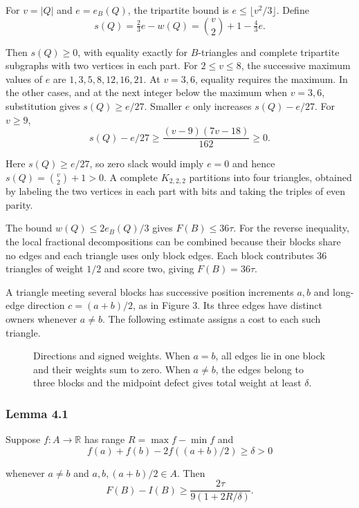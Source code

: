 \documentclass[english,11pt,a4paper]{article}
\begin{document}
For \(v=|Q|\) and \(e=e_B(Q)\), the tripartite bound is \(e\le\lfloor v^2/3\rfloor\). Define
\[s(Q)=\tfrac23 e-w(Q)=\binom v2+1-\tfrac43e.\]

Then \(s(Q)\ge0\), with equality exactly for \(B\)-triangles and complete tripartite subgraphs with two vertices in each part. For \(2\le v\le8\), the successive maximum values of \(e\) are \(1,3,5,8,12,16,21\). At \(v=3,6\), equality requires the maximum. In the other cases, and at the next integer below the maximum when \(v=3,6\), substitution gives \(s(Q)\ge e/27\). Smaller \(e\) only increases \(s(Q)-e/27\). For \(v\ge9\),
\[s(Q)-e/27\ge \frac{(v-9)(7v-18)}{162}\ge0.\]

Here \(s(Q)\ge e/27\), so zero slack would imply \(e=0\) and hence \(s(Q)=\binom v2+1>0\). A complete \(K_{2,2,2}\) partitions into four triangles, obtained by labeling the two vertices in each part with bits and taking the triples of even parity.

The bound \(w(Q)\le 2e_B(Q)/3\) gives \(F(B)\le36\tau\). For the reverse inequality, the local fractional decompositions can be combined because their blocks share no edges and each triangle uses only block edges. Each block contributes 36 triangles of weight \(1/2\) and score two, giving \(F(B)=36\tau\).

A triangle meeting several blocks has successive position increments \(a,b\) and long-edge direction \(c=(a+b)/2\), as in Figure 3. Its three edges have distinct owners whenever \(a\ne b\). The following estimate assigns a cost to each such triangle.

\begin{figure}[htbp]
\centering
\caption{Directions and signed weights. When $a=b$, all edges lie in one block and their weights sum to zero. When $a\ne b$, the edges belong to three blocks and the midpoint defect gives total weight at least $\delta$.}\label{fig:signed-triangle}
\end{figure}

\subsubsection{Lemma 4.1}\label{lemma-4.1}

Suppose \(f:A\to\mathbb R\) has range \(R=\max f-\min f\) and
\[f(a)+f(b)-2f((a+b)/2)\ge\delta>0\]

whenever \(a\ne b\) and \(a,b,(a+b)/2\in A\). Then
\[F(B)-I(B)\ge \frac{2\tau}{9(1+2R/\delta)}.\]
\end{document}
